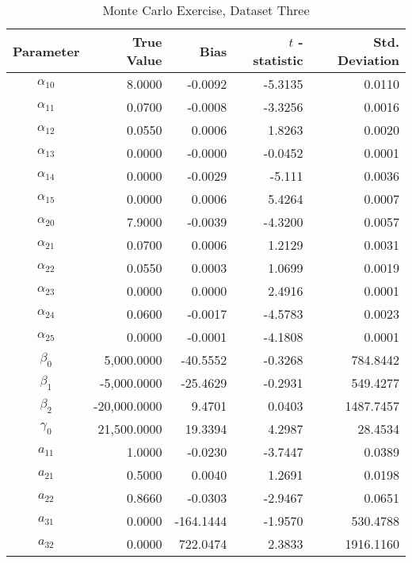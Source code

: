 \begin{table}\onehalfspacing
\begin{center}
\begin{threeparttable}
  \caption{Monte Carlo Exercise, Dataset Three}
  \label{Monte Carlo: Three}
  \begin{tabular}{crrrr}\toprule

  Parameter & True Value & Bias & $t$ - statistic & Std. Deviation \\
  \midrule
  $\alpha_{10}$ &    \phantom{20000}8.0000 &   -0.0092 &  -5.3135 &    0.0110 \\
  $\alpha_{11}$ &      0.0700 & -0.0008 & -3.3256 & 0.0016 \\
  $\alpha_{12}$ &      0.0550 & 0.0006 & 1.8263 & 0.0020\\
  $\alpha_{13}$ &      0.0000 & -0.0000 & -0.0452 & 0.0001\\
  $\alpha_{14}$ &      0.0000 & -0.0029 & -5.111  & 0.0036 \\
  $\alpha_{15}$ &      0.0000 & 0.0006 & 5.4264   & 0.0007 \\
  $\alpha_{20}$ &      7.9000 & -0.0039 & -4.3200  & 0.0057    \\
  $\alpha_{21}$ &      0.0700 &  0.0006 & 1.2129  & 0.0031    \\
  $\alpha_{22}$ &      0.0550 & 0.0003 & 1.0699   & 0.0019  \\
  $\alpha_{23}$ &      0.0000 & 0.0000 & 2.4916    & 0.0001 \\
  $\alpha_{24}$ &      0.0600 & -0.0017 & -4.5783    & 0.0023\\
  $\alpha_{25}$ &      0.0000 & -0.0001 & -4.1808  & 0.0001    \\
  $\beta_{0}$   &   5,000.0000 & -40.5552 & -0.3268  & 784.8442  \\
  $\beta_{1}$   &   -5,000.0000 & -25.4629 & -0.2931  & 549.4277  \\
  $\beta_{2}$   &  -20,000.0000 & 9.4701 & 0.0403 & 1487.7457  \\
  $\gamma_{0}$  &   21,500.0000 & 19.3394 & 4.2987 & 28.4534 \\
  $a_{11}$      &      1.0000 & -0.0230 & -3.7447 & 0.0389 \\
  $a_{21}$      &      0.5000 & 0.0040 & 1.2691 & 0.0198  \\
  $a_{22}$      &      0.8660 & -0.0303 & -2.9467  & 0.0651 \\
  $a_{31}$      &      0.0000 & -164.1444 & -1.9570  & 530.4788  \\
  $a_{32}$      &      0.0000 & 722.0474 & 2.3833  & 1916.1160  \\

\end{tabular}
\end{threeparttable}
\end{center}
\end{table}
